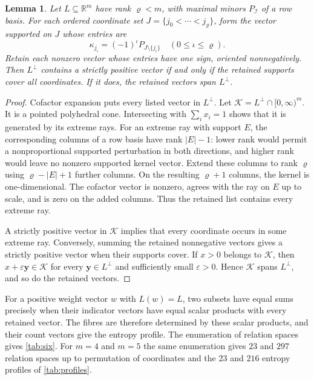 \documentclass[11pt,a4paper]{article}
\numberwithin{equation}{section}
\newtheorem{lemma}[theorem]{Lemma}
\theoremstyle{remark}
\newcommand{\eps}{\varepsilon}
\newcommand{\R}{\mathbb R}
\begin{document}
\begin{lemma}\label{lem:positive}
Let $L\subseteq\R^m$ have rank ${\varrho}<m$, with maximal minors $P_{\mathcal I}$ of a row basis. For each ordered coordinate set $J=\{j_0<\cdots<j_{\varrho}\}$, form the vector supported on $J$ whose entries are
\[
 \kappa_{j_\iota}=(-1)^{\iota}P_{J\setminus\{j_\iota\}}\quad(0\le\iota\le\varrho).
\]
Retain each nonzero vector whose entries have one sign, oriented nonnegatively. Then $L^\perp$ contains a strictly positive vector if and only if the retained supports cover all coordinates. If it does, the retained vectors span $L^\perp$.
\end{lemma}
\begin{proof}
Cofactor expansion puts every listed vector in $L^\perp$. Let $\mathcal K=L^\perp\cap[0,\infty)^m$. It is a pointed polyhedral cone. Intersecting with $\sum_i x_i=1$ shows that it is generated by its extreme rays. For an extreme ray with support $E$, the corresponding columns of a row basis have rank $|E|-1$: lower rank would permit a nonproportional supported perturbation in both directions, and higher rank would leave no nonzero supported kernel vector. Extend these columns to rank ${\varrho}$ using ${\varrho}-|E|+1$ further columns. On the resulting ${\varrho}+1$ columns, the kernel is one-dimensional. The cofactor vector is nonzero, agrees with the ray on $E$ up to scale, and is zero on the added columns. Thus the retained list contains every extreme ray.

A strictly positive vector in $\mathcal K$ implies that every coordinate occurs in some extreme ray. Conversely, summing the retained nonnegative vectors gives a strictly positive vector when their supports cover. If $x>0$ belongs to $\mathcal K$, then $x+\eps\mathbf y\in \mathcal K$ for every $\mathbf y\in L^\perp$ and sufficiently small $\eps>0$. Hence $\mathcal K$ spans $L^\perp$, and so do the retained vectors.
\end{proof}

For a positive weight vector $w$ with $L(w)=L$, two subsets have equal sums precisely when their indicator vectors have equal scalar products with every retained vector. The fibres are therefore determined by these scalar products, and their count vectors give the entropy profile. The enumeration of relation spaces gives \cref{tab:six}. For $m=4$ and $m=5$ the same enumeration gives $23$ and $297$ relation spaces up to permutation of coordinates and the $23$ and $216$ entropy profiles of \cref{tab:profiles}.
\end{document}
